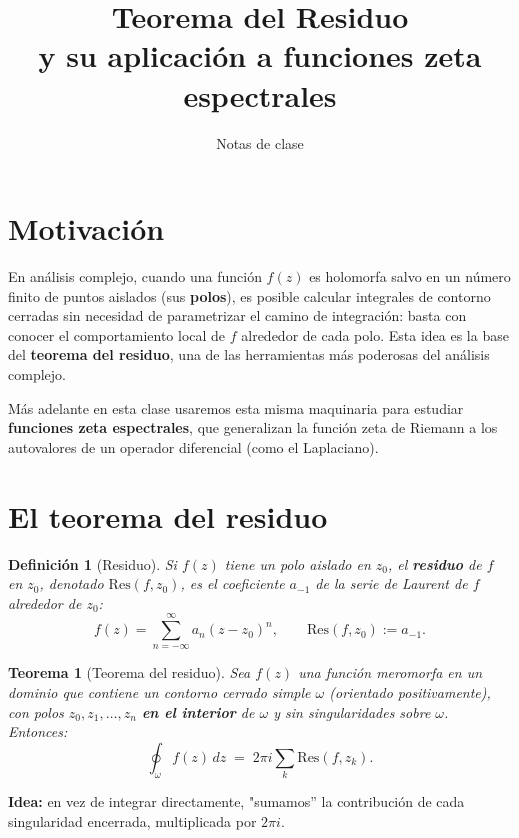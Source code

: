 \documentclass[12pt]{article}
\title{\bfseries Teorema del Residuo\\ \large y su aplicación a funciones zeta espectrales}
\author{Notas de clase}
\date{}
\newtheorem{teorema}{Teorema}
\newtheorem{definicion}{Definición}
\begin{document}
\maketitle

\tableofcontents
\vspace{1cm}

\section{Motivación}

En análisis complejo, cuando una función $f(z)$ es holomorfa salvo en un número finito de puntos aislados (sus \textbf{polos}), es posible calcular integrales de contorno cerradas sin necesidad de parametrizar el camino de integración: basta con conocer el comportamiento local de $f$ alrededor de cada polo. Esta idea es la base del \textbf{teorema del residuo}, una de las herramientas más poderosas del análisis complejo.

Más adelante en esta clase usaremos esta misma maquinaria para estudiar \textbf{funciones zeta espectrales}, que generalizan la función zeta de Riemann a los autovalores de un operador diferencial (como el Laplaciano).

\section{El teorema del residuo}

\begin{definicion}[Residuo]
Si $f(z)$ tiene un polo aislado en $z_0$, el \textbf{residuo} de $f$ en $z_0$, denotado $\mathrm{Res}(f,z_0)$, es el coeficiente $a_{-1}$ de la serie de Laurent de $f$ alrededor de $z_0$:
\[
f(z) = \sum_{n=-\infty}^{\infty} a_n (z-z_0)^n, \qquad \mathrm{Res}(f,z_0) := a_{-1}.
\]
\end{definicion}

\begin{teorema}[Teorema del residuo]
Sea $f(z)$ una función meromorfa en un dominio que contiene un contorno cerrado simple $\omega$ (orientado positivamente), con polos $z_0, z_1, \dots, z_n$ \textbf{en el interior} de $\omega$ y sin singularidades sobre $\omega$. Entonces:
\[
\oint_{\omega} f(z)\,dz \;=\; 2\pi i \sum_{k} \mathrm{Res}(f, z_k).
\]
\end{teorema}

\noindent \textbf{Idea:} en vez de integrar directamente, "sumamos'' la contribución de cada singularidad encerrada, multiplicada por $2\pi i$.
\end{document}
